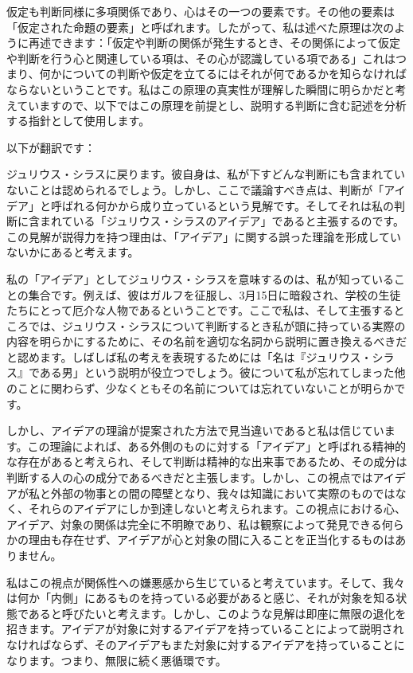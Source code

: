 \documentclass[a4paper,11pt,openany]{ltjsbook}
\begin{document}
仮定も判断同様に多項関係であり、心はその一つの要素です。その他の要素は「仮定された命題の要素」と呼ばれます。したがって、私は述べた原理は次のように再述できます：「仮定や判断の関係が発生するとき、その関係によって仮定や判断を行う心と関連している項は、その心が認識している項である」これはつまり、何かについての判断や仮定を立てるにはそれが何であるかを知らなければならないということです。私はこの原理の真実性が理解した瞬間に明らかだと考えていますので、以下ではこの原理を前提とし、説明する判断に含む記述を分析する指針として使用します。

以下が翻訳です：

ジュリウス・シラスに戻ります。彼自身は、私が下すどんな判断にも含まれていないことは認められるでしょう。しかし、ここで議論すべき点は、判断が「アイデア」と呼ばれる何かから成り立っているという見解です。そしてそれは私の判断に含まれている「ジュリウス・シラスのアイデア」であると主張するのです。この見解が説得力を持つ理由は、「アイデア」に関する誤った理論を形成していないかにあると考えます。

私の「アイデア」としてジュリウス・シラスを意味するのは、私が知っていることの集合です。例えば、彼はガルフを征服し、3月15日に暗殺され、学校の生徒たちにとって厄介な人物であるということです。ここで私は、そして主張するところでは、ジュリウス・シラスについて判断するとき私が頭に持っている実際の内容を明らかにするために、その名前を適切な名詞から説明に置き換えるべきだと認めます。しばしば私の考えを表現するためには「名は『ジュリウス・シラス』である男」という説明が役立つでしょう。彼について私が忘れてしまった他のことに関わらず、少なくともその名前については忘れていないことが明らかです。

しかし、アイデアの理論が提案された方法で見当違いであると私は信じています。この理論によれば、ある外側のものに対する「アイデア」と呼ばれる精神的な存在があると考えられ、そして判断は精神的な出来事であるため、その成分は判断する人の心の成分であるべきだと主張します。しかし、この視点ではアイデアが私と外部の物事との間の障壁となり、我々は知識において実際のものではなく、それらのアイデアにしか到達しないと考えられます。この視点における心、アイデア、対象の関係は完全に不明瞭であり、私は観察によって発見できる何らかの理由も存在せず、アイデアが心と対象の間に入ることを正当化するものはありません。

私はこの視点が関係性への嫌悪感から生じていると考えています。そして、我々は何か「内側」にあるものを持っている必要があると感じ、それが対象を知る状態であると呼びたいと考えます。しかし、このような見解は即座に無限の退化を招きます。アイデアが対象に対するアイデアを持っていることによって説明されなければならず、そのアイデアもまた対象に対するアイデアを持っていることになります。つまり、無限に続く悪循環です。
\end{document}
